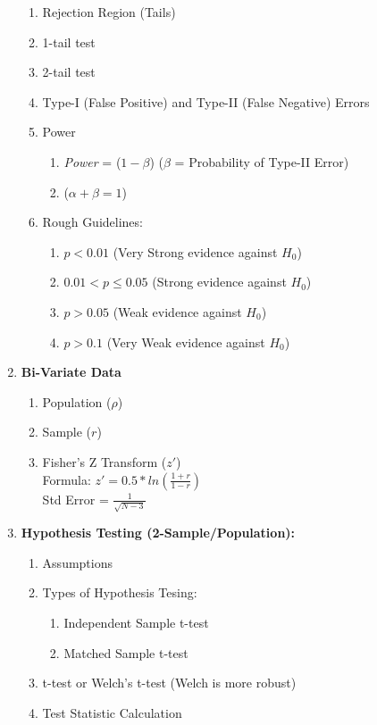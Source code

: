 \documentclass[11pt]{article}
\begin{document}
\begin{enumerate}
\begin{enumerate}
	\item Rejection Region (Tails)
	\item 1-tail test
	\item 2-tail test
	\item Type-I (False Positive) and Type-II (False Negative) Errors
	\item Power
	\begin{enumerate}
		\item \textit{Power} = ($1 - \beta$) ($\beta$ = Probability of Type-II Error)
		\item ($\alpha + \beta = 1$) 
	\end{enumerate}
	\item Rough Guidelines:
	\begin{enumerate}
		\item $p < 0.01$ (Very Strong evidence against $H_0$)
		\item $0.01 < p \leq 0.05$ (Strong evidence against $H_0$)
		\item $p > 0.05$ (Weak evidence against $H_0$)
		\item $p > 0.1$ (Very Weak evidence against $H_0$)
	\end{enumerate}
\end{enumerate} 
\item \textbf{Bi-Variate Data}
\begin{enumerate}
	\item Population ($\rho$)
	\item Sample ($r$)
	\item Fisher's Z Transform ($z'$) \\
	Formula:
	$z' = 0.5 * ln(\frac{1 + r}{1 - r})  $ \\
	Std Error = $\frac{1}{\sqrt{N - 3}}$
\end{enumerate}
\item \textbf{Hypothesis Testing (2-Sample/Population):}
\begin{enumerate}
	\item Assumptions
	\item Types of Hypothesis Tesing:
	\begin{enumerate}
		\item Independent Sample t-test
		\item Matched Sample t-test
	\end{enumerate}
	\item t-test or Welch's t-test (Welch is more robust)
	\item Test Statistic Calculation
\end{enumerate}

\end{enumerate}
\end{document}
